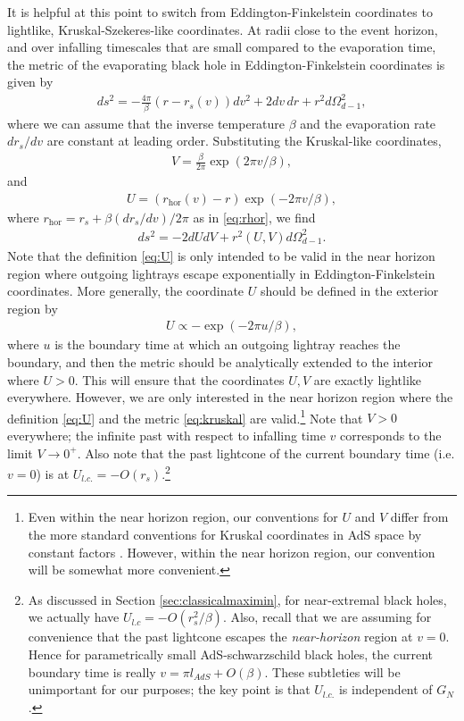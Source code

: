\documentclass[12pt]{article}
\begin{document}
It is helpful at this point to switch from Eddington-Finkelstein coordinates to lightlike, Kruskal-Szekeres-like coordinates. At radii close to the event horizon, and over infalling timescales that are small compared to the evaporation time, the metric of the evaporating black hole in Eddington-Finkelstein coordinates is given by
\begin{align}
ds^2 =  - \frac{4 \pi} {\beta}(r - r_s(v)) dv^2 + 2 dv\, dr + r^2 d\Omega_{d-1}^2,
\end{align}
where we can assume that the inverse temperature $\beta$ and the evaporation rate $d r_s/ dv$ are constant at leading order. Substituting the Kruskal-like coordinates,
\begin{align} \label{eq:V}
V = \frac{\beta}{2 \pi} \exp(2 \pi v /\beta),
\end{align}
and
\begin{align} \label{eq:U}
U = (r_\text{hor}(v) - r) \exp(- 2 \pi v / \beta),
\end{align}
where $r_\text{hor} = r_s + \beta (d r_s / d v) / 2 \pi$ as in \eqref{eq:rhor}, we find
\begin{align} \label{eq:kruskal}
ds^2  = -2 dU dV + r^2 (U, V) d\Omega_{d-1}^2.
\end{align}
Note that the definition \eqref{eq:U} is only intended to be valid in the near horizon region where outgoing lightrays escape exponentially in Eddington-Finkelstein coordinates. More generally, the coordinate $U$ should be defined in the exterior region by 
\begin{align}
U \propto - \exp(- 2 \pi u / \beta),
\end{align}
where $u$ is the boundary time at which an outgoing lightray reaches the boundary, and then the metric should be analytically extended to the interior where $U > 0$. This will ensure that the coordinates $U, V$ are exactly lightlike everywhere. However, we are only interested in the near horizon region where the definition \eqref{eq:U} and the metric \eqref{eq:kruskal} are valid.\footnote{Even within the near horizon region, our conventions for $U$ and $V$ differ from the more standard conventions for Kruskal coordinates in AdS space by constant factors \cite{harlow2016jerusalem}. However, within the near horizon region, our convention will be somewhat more convenient.} Note that $V>0$ everywhere; the infinite past with respect to infalling time $v$ corresponds to the limit $V \to 0^+$. Also note that the past lightcone of the current boundary time (i.e. $v = 0$) is at $U_{l.c.} = - O(r_s)$.\footnote{As discussed in Section \ref{sec:classicalmaximin}, for near-extremal black holes, we actually have $U_{l.c} = - O(r_s^2/ \beta)$. Also, recall that we are assuming for convenience that the past lightcone escapes the \emph{near-horizon} region at $v=0$. Hence for parametrically small AdS-schwarzschild black holes, the current boundary time is really $v = \pi l_{AdS} + O(\beta)$. These subtleties will be unimportant for our purposes; the key point is that $U_{l.c.}$ is independent of $G_N$.}
\end{document}
